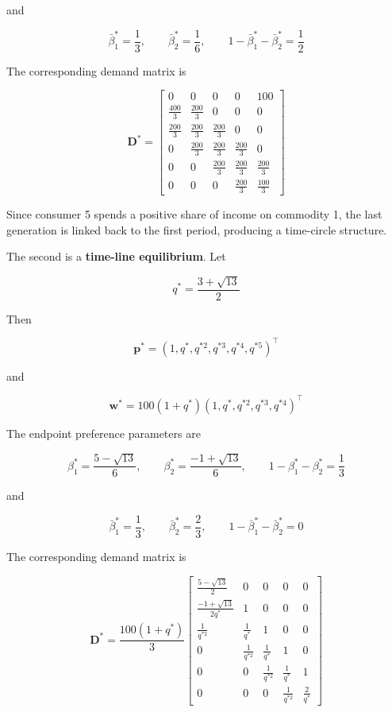 \documentclass[
  letterpaper,
  DIV=11,
  numbers=noendperiod]{scrreprt}
\begin{document}
and

\[
\bar\beta_1^*=\frac13,\qquad
\bar\beta_2^*=\frac16,\qquad
1-\bar\beta_1^*-\bar\beta_2^*=\frac12
\]

The corresponding demand matrix is

\[
\mathbf D^*=
\begin{bmatrix}
0&0&0&0&100\\
\frac{400}{3}&\frac{200}{3}&0&0&0\\
\frac{200}{3}&\frac{200}{3}&\frac{200}{3}&0&0\\
0&\frac{200}{3}&\frac{200}{3}&\frac{200}{3}&0\\
0&0&\frac{200}{3}&\frac{200}{3}&\frac{200}{3}\\
0&0&0&\frac{200}{3}&\frac{100}{3}
\end{bmatrix}
\]

Since consumer 5 spends a positive share of income on commodity 1, the
last generation is linked back to the first period, producing a
time-circle structure.

The second is a \textbf{time-line equilibrium}. Let

\[
q^*=\frac{3+\sqrt{13}}{2}
\]

Then

\[
\mathbf p^*=(1,q^*,q^{*2},q^{*3},q^{*4},q^{*5})^\top
\]

and

\[
\mathbf w^*
=
100(1+q^*)
(1,q^*,q^{*2},q^{*3},q^{*4})^\top
\]

The endpoint preference parameters are

\[
\beta_1^*=\frac{5-\sqrt{13}}6,\qquad
\beta_2^*=\frac{-1+\sqrt{13}}6,\qquad
1-\beta_1^*-\beta_2^*=\frac13
\]

and

\[
\bar\beta_1^*=\frac13,\qquad
\bar\beta_2^*=\frac23,\qquad
1-\bar\beta_1^*-\bar\beta_2^*=0
\]

The corresponding demand matrix is

\[
\mathbf D^*
=
\frac{100(1+q^*)}{3}
\begin{bmatrix}
\frac{5-\sqrt{13}}2&0&0&0&0\\
\frac{-1+\sqrt{13}}{2q^*}&1&0&0&0\\
\frac{1}{q^{*2}}&\frac{1}{q^*}&1&0&0\\
0&\frac{1}{q^{*2}}&\frac{1}{q^*}&1&0\\
0&0&\frac{1}{q^{*2}}&\frac{1}{q^*}&1\\
0&0&0&\frac{1}{q^{*2}}&\frac{2}{q^*}
\end{bmatrix}
\]
\end{document}
